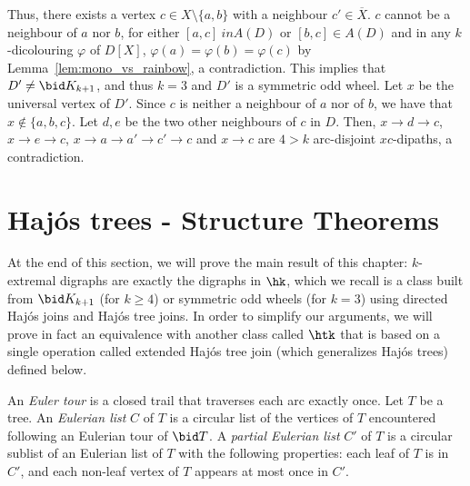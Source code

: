     Thus, there exists a vertex $c \in X \setminus \{a,b\}$ with a neighbour $c' \in \overline{X}$. $c$ cannot be a neighbour of $a$ nor $b$, for either $[a,c] \ in A(D)$ or $[b,c] \in A(D)$ and in any $k$-dicolouring $\varphi$ of $D[X]$, $\varphi(a) = \varphi(b) = \varphi(c)$ by Lemma~\ref{lem:mono_vs_rainbow}, a contradiction. This implies that $D' \neq \bid K_{k+1}$, and thus $k=3$ and $D'$ is a symmetric odd wheel. Let $x$ be the universal vertex of $D'$. Since $c$ is neither a neighbour of $a$ nor of $b$, we have that $x \notin \{a,b,c\}$. Let $d,e$ be the two other neighbours of $c$ in $D$. Then, $x \rightarrow d \rightarrow c$, $x \rightarrow e \rightarrow c$, $x \rightarrow a \rightarrow a' \rightarrow c' \rightarrow c$ and $x \rightarrow c$ are $4 > k$ arc-disjoint $xc$-dipaths, a contradiction.


    
    
  
\section{Haj\'os trees - Structure Theorems}\label{sec:mainthm}
At the end of this section, we will prove the main result of this chapter: $k$-extremal digraphs are exactly the digraphs in $\hk$, which we recall is a class built from  $\bid K_{k+1}$ (for $k\geq 4$) or symmetric odd wheels (for $k = 3$) using directed Haj\'os  joins and Haj\'os tree joins. In order to simplify our arguments, we will prove in fact an equivalence with another class called $\htk$ that is based on a single operation called extended Haj\'os tree join (which generalizes Haj\'os trees) defined below.

An \emph{Euler tour} is a closed trail that traverses each arc exactly once. 
Let $T$ be a tree. An \emph{Eulerian list} $C$ of $T$  is a circular list of the vertices of $T$ encountered following an Eulerian tour of $\bid T$. A \emph{partial Eulerian list} $C'$ of $T$ is a circular sublist of an Eulerian list of $T$  with the following properties: 
 each leaf of $T$ is in $C'$, and each non-leaf vertex of $T$ appears at most once in $C'$.  %


